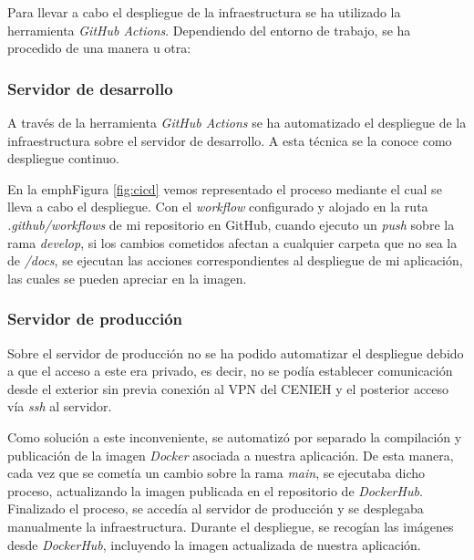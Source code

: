Para llevar a cabo el despliegue de la infraestructura se ha utilizado
la herramienta \emph{GitHub Actions}. Dependiendo del entorno de
trabajo, se ha procedido de una manera u otra:

\subsubsection{Servidor de desarrollo}

A través de la herramienta \emph{GitHub Actions} se ha automatizado el
despliegue de la infraestructura sobre el servidor de desarrollo. A esta
técnica se la conoce como despliegue continuo.


En la emph{Figura} \ref{fig:cicd} vemos representado el proceso mediante el cual se lleva
a cabo el despliegue. Con el \emph{workflow} configurado y alojado en la
ruta \emph{.github/workflows} de mi repositorio en GitHub, cuando
ejecuto un \emph{push} sobre la rama \emph{develop}, si los cambios
cometidos afectan a cualquier carpeta que no sea la de \emph{/docs}, se
ejecutan las acciones correspondientes al despliegue de mi aplicación,
las cuales se pueden apreciar en la imagen.

\subsubsection{Servidor de producción}

Sobre el servidor de producción no se ha podido automatizar el
despliegue debido a que el acceso a este era privado, es decir, no se
podía establecer comunicación desde el exterior sin previa conexión al
VPN del CENIEH y el posterior acceso vía \emph{ssh} al servidor.


Como solución a este inconveniente, se automatizó por separado la
compilación y publicación de la imagen \emph{Docker} asociada a nuestra
aplicación. De esta manera, cada vez que se cometía un cambio sobre la
rama \emph{main}, se ejecutaba dicho proceso, actualizando la imagen
publicada en el repositorio de \emph{DockerHub}. Finalizado el proceso,
se accedía al servidor de producción y se desplegaba manualmente la
infraestructura. Durante el despliegue, se recogían las imágenes desde
\emph{DockerHub}, incluyendo la imagen actualizada de nuestra
aplicación.
